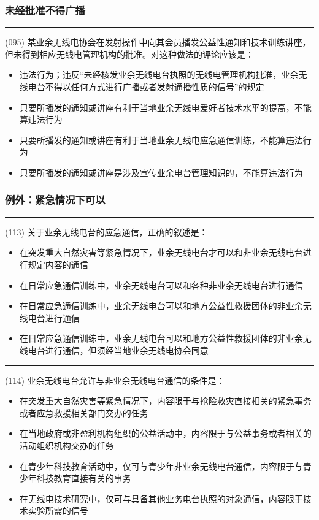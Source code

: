 \documentclass[twocolumn,hyperref,UTF8]{ctexart}  %
\begin{document}
\vspace{12pt}
\subsubsection{未经批准不得广播}


\noindent\rule{0.5\textwidth}{1pt}
\heiti (095) 某业余无线电协会在发射操作中向其会员播发公益性通知和技术训练讲座，但未得到相应无线电管理机构的批准。对这种做法的评论应该是： \songti {\color{gray} [LK0059] }
\begin{itemize}
	\item  违法行为；违反“未经核发业余无线电台执照的无线电管理机构批准，业余无线电台不得以任何方式进行广播或者发射通播性质的信号”的规定
	\item  只要所播发的通知或讲座有利于当地业余无线电爱好者技术水平的提高，不能算违法行为
	\item  只要所播发的通知或讲座有利于当地业余无线电应急通信训练，不能算违法行为
	\item  只要所播发的通知或讲座是涉及宣传业余电台管理知识的，不能算违法行为
\end{itemize}


\vspace{12pt}
\subsubsection{例外：紧急情况下可以}


\noindent\rule{0.5\textwidth}{1pt}
\heiti (113) 关于业余无线电台的应急通信，正确的叙述是： \songti {\color{gray} [LK0053] }
\begin{itemize}
	\item  在突发重大自然灾害等紧急情况下，业余无线电台才可以和非业余无线电台进行规定内容的通信
	\item  在日常应急通信训练中，业余无线电台可以和各种非业余无线电台进行通信
	\item  在日常应急通信训练中，业余无线电台可以和地方公益性救援团体的非业余无线电台进行通信
	\item  在日常应急通信训练中，业余无线电台可以和地方公益性救援团体的非业余无线电台进行通信，但须经当地业余无线电协会同意
\end{itemize}


\noindent\rule{0.5\textwidth}{1pt}
\heiti (114) 业余无线电台允许与非业余无线电台通信的条件是： \songti {\color{gray} [LK0054] }
\begin{itemize}
	\item  在突发重大自然灾害等紧急情况下，内容限于与抢险救灾直接相关的紧急事务或者应急救援相关部门交办的任务
	\item  在当地政府或非盈利机构组织的公益活动中，内容限于与公益事务或者相关的活动组织机构交办的任务
	\item  在青少年科技教育活动中，仅可与青少年非业余无线电台通信，内容限于与青少年科技教育直接有关的事务
	\item  在无线电技术研究中，仅可与具备其他业务电台执照的对象通信，内容限于技术实验所需的信号
\end{itemize}
\end{document}
